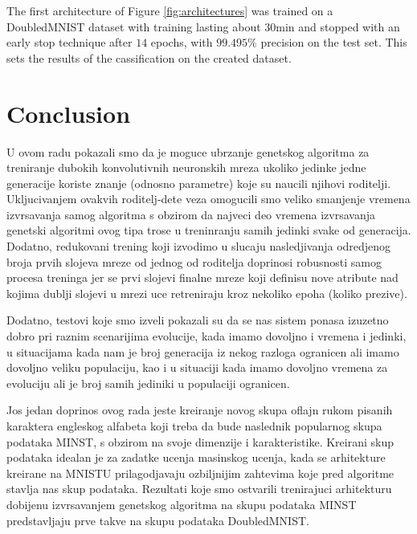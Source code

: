 \documentclass[eng]{simposium}
\begin{document}
The first architecture of Figure \ref{fig:architectures} was trained on a DoubledMNIST dataset with training lasting about 
$30$min and stopped with an early stop technique after $14$ epochs, with $99.495\%$ precision on the test set. 
This sets the results of the cassification on the created dataset. 

\section{Conclusion}

U ovom radu pokazali smo da je moguce ubrzanje genetskog algoritma za treniranje dubokih konvolutivnih neuronskih mreza 
ukoliko jedinke jedne generacije koriste znanje (odnosno parametre) koje su naucili njihovi roditelji. 
Ukljucivanjem ovakvih roditelj-dete veza omogucili smo veliko smanjenje vremena izvrsavanja samog algoritma s obzirom da 
najveci deo vremena izvrsavanja genetski algoritmi ovog tipa trose u treninranju samih jedinki svake od generacija. 
Dodatno, redukovani trening koji izvodimo u slucaju nasledjivanja odredjenog broja prvih slojeva mreze od jednog od roditelja 
doprinosi robusnosti samog procesa treninga jer se prvi slojevi finalne mreze koji definisu nove atribute nad kojima dublji 
slojevi u mrezi uce retreniraju kroz nekoliko epoha (koliko prezive). %

Dodatno, testovi koje smo izveli pokazali su da se nas sistem ponasa izuzetno dobro pri raznim scenarijima evolucije, 
kada imamo dovoljno i vremena i jedinki, u situacijama kada nam je broj generacija iz nekog razloga ogranicen ali imamo dovoljno 
veliku populaciju, kao i u situaciji kada imamo dovoljno vremena za evoluciju ali je broj samih jediniki u populaciji ogranicen.

Jos jedan doprinos ovog rada jeste kreiranje novog skupa oflajn rukom pisanih karaktera engleskog alfabeta koji treba da bude 
naslednik popularnog skupa podataka MINST, s obzirom na svoje dimenzije i karakteristike. Kreirani skup podataka idealan je 
za zadatke ucenja masinskog ucenja, kada se arhitekture kreirane na MNISTU prilagodjavaju ozbiljnijim zahtevima koje pred 
algoritme stavlja nas skup podataka. 
Rezultati koje smo ostvarili trenirajuci arhitekturu dobijenu izvrsavanjem genetskog algoritma na skupu podataka MINST predstavljaju 
prve takve na skupu podataka DoubledMNIST.

\newpage
\end{document}

